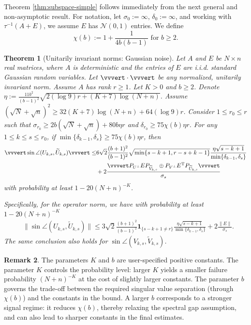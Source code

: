 \documentclass[reqno]{amsart}
\newcommand{\T}{\mathrm{T}}
\theoremstyle{plain}
\newtheorem{theorem}{Theorem}
\theoremstyle{definition}
\newtheorem{remark}[theorem]{Remark}
\begin{document}
Theorem \ref{thm:subspace-simple} follows immediately from the next general and non-asymptotic result. For notation, let $\sigma_0:=\infty$, $\delta_0:=\infty$, and working with $\tau^{-1}(A+E)$, we assume $E$ has $\mathcal N(0,1)$ entries. We define $$\chi(b):= 1+ \frac{1}{4b(b-1)}  \text{ for } b\ge 2.$$
\begin{theorem}[Unitarily invariant norms: Gaussian noise]\label{thm:subspace}
Let $A$ and $E$ be $N \times n$ real matrices, where $A$ is deterministic and the entries of $E$ are i.i.d. standard Gaussian random variables. Let $\vvvert \cdot \vvvert$ be any normalized, unitarily invariant norm. Assume $A$ has rank $r \geq 1$. Let $K>0$ and $b\ge 2$. Denote $\eta:= \frac{11b^2}{(b-1)^2} \sqrt{2(\log 9) r+(K+7) \log (N+n)}$. Assume $(\sqrt N + \sqrt n)^2 \ge 32(K+7)\log(N+n) + 64(\log 9) r$. Consider $1\le r_0 \le r$ such that $ \sigma_{r_0} \ge 2b(\sqrt N+ \sqrt{n}) + 80b\eta r$ and $\delta_{r_0}\geq 75\chi(b)\eta r$. For any $1\le k \le s \leq r_0$, if  $\min\{\delta_{k-1}, \delta_s\}\geq 75\chi(b)\eta r$,  then
\begin{align}\label{eq:subspacebd}
\vvvert \sin \angle ( U_{k,s}, \widetilde{ U}_{k,s})\vvvert \le& 6\sqrt{2} \frac{(b+1)^2}{(b-1)^2}\sqrt{\min\{s-k+1,r-s+k-1\}} \frac{ \eta\sqrt{s-k+1}}{\min\{\delta_{k-1}, \delta_s\}} \nonumber\\
& + 2 \frac{\vvvert P_{U^\perp} E P_{\widetilde V_{k,s}} \oplus P_{V^\perp} E^\T P_{\widetilde U_{k,s}} \vvvert}{{\sigma}_{s}}
\end{align}
with probability at least $1 - 20(N+n)^{-K}$. 

Specifically, for the operator norm, we have with probability at least $1 - 20(N+n)^{-K}$
\begin{align*}
&\|\sin \angle ( U_{k,s}, \widetilde{ U}_{k,s})\| \le 3\sqrt{2} \frac{(b+1)^2}{(b-1)^2}\mathbf{1}_{\{s-k+1\neq r \}} \frac{ \eta\sqrt{s-k+1}}{\min\{\delta_{k-1}, \delta_s\}} + 2 \frac{\|E\|}{{\sigma}_{s}}.
\end{align*}
The same conclusion also holds for $\sin \angle ( V_{k,s}, \widetilde{ V}_{k,s})$.
\end{theorem}

\begin{remark}
The parameters $K$ and $b$ are user-specified positive constants. The parameter $K$ controls the probability level: larger $K$ yields a smaller failure probability $(N+n)^{-K}$ at the cost of slightly larger constants. The parameter $b$ governs the trade-off between the required singular value separation (through $\chi(b)$) and the constants in the bound. A larger $b$ corresponds to a stronger signal regime: it reduces $\chi(b)$, thereby relaxing the spectral gap assumption, and can also lead to sharper constants in the final estimates. 
\end{remark} 
\end{document}
